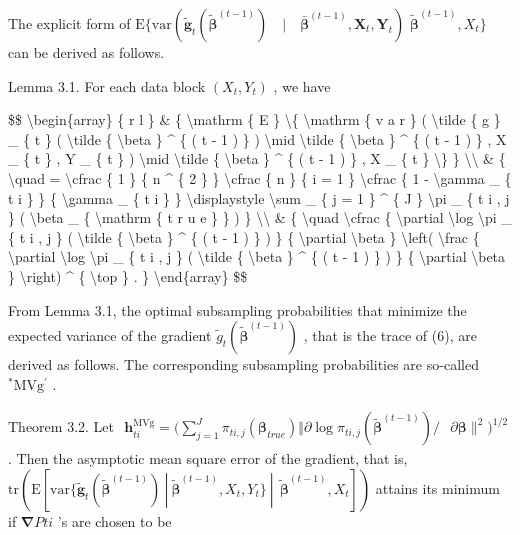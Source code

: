 \documentclass[
  10
]{article}
\begin{document}
The explicit form of
\(\mathrm { E } \{ \mathrm { v a r } ( \tilde { \pmb g } _ { t } ( \tilde { \pmb \beta } ^ { ( t - 1 ) } ) \quad | \quad \bar { \pmb \beta } ^ { ( t - 1 ) } , \boldsymbol { X } _ { t } , \boldsymbol { Y } _ { t } )\)
\(\tilde { \pmb { \beta } } ^ { ( t - 1 ) } , X _ { t } \}\) can be
derived as follows.

Lemma 3.1. For each data block \(( X _ { t } , Y _ { t } )\) , we have

{\$\$ \textbackslash begin\{array\} \{ r l \} \& \{
\textbackslash mathrm \{ E \} \textbackslash\{ \textbackslash mathrm \{
v a r \} ( \textbackslash tilde \{ g \} \_ \{ t \} (
\textbackslash tilde \{ \textbackslash beta \} \^{} \{ ( t - 1 ) \} )
\textbackslash mid \textbackslash tilde \{ \textbackslash beta \} \^{}
\{ ( t - 1 ) \} , X \_ \{ t \} , Y \_ \{ t \} ) \textbackslash mid
\textbackslash tilde \{ \textbackslash beta \} \^{} \{ ( t - 1 ) \} , X
\_ \{ t \} \textbackslash\} \} \textbackslash\textbackslash{} \& \{
\textbackslash quad = \textbackslash cfrac \{ 1 \} \{ n \^{} \{ 2 \} \}
\textbackslash cfrac \{ n \} \{ i = 1 \} \textbackslash cfrac \{ 1 -
\textbackslash gamma \_ \{ t i \} \} \{ \textbackslash gamma \_ \{ t i
\} \} \textbackslash displaystyle \textbackslash sum \_ \{ j = 1 \} \^{}
\{ J \} \textbackslash pi \_ \{ t i , j \} ( \textbackslash beta \_ \{
\textbackslash mathrm \{ t r u e \} \} ) \}
\textbackslash\textbackslash{} \& \{ \textbackslash quad
\textbackslash cfrac \{ \textbackslash partial \textbackslash log
\textbackslash pi \_ \{ t i , j \} ( \textbackslash tilde \{
\textbackslash beta \} \^{} \{ ( t - 1 ) \} ) \} \{
\textbackslash partial \textbackslash beta \} \textbackslash left(
\textbackslash frac \{ \textbackslash partial \textbackslash log
\textbackslash pi \_ \{ t i , j \} ( \textbackslash tilde \{
\textbackslash beta \} \^{} \{ ( t - 1 ) \} ) \} \{
\textbackslash partial \textbackslash beta \} \textbackslash right) \^{}
\{ \textbackslash top \} . \} \textbackslash end\{array\} \$\$}

From Lemma 3.1, the optimal subsampling probabilities that minimize the
expected variance of the gradient
\(\tilde { g } _ { t } ( \tilde { \boldsymbol { \beta } } ^ { ( t - 1 ) } )\)
, that is the trace of (6), are derived as follows. The corresponding
subsampling probabilities are so-called
\(\mathrm { ^ { \ast } M V g ^ { \prime } }\) .

Theorem 3.2. Let
\(\begin{array} { r } { \pmb { h } _ { t i } ^ { \mathrm { M V g } } = ( \sum _ { j = 1 } ^ { J } \pi _ { t i , j } ( \pmb { \beta } _ { t r u e } ) \Vert \partial \log \pi _ { t i , j } ( \tilde { \pmb { \beta } } ^ { ( t - 1 ) } ) / } \end{array}\)
\(\partial \pmb { \beta } \| ^ { 2 } ) ^ { 1 / 2 }\) . Then the
asymptotic mean square error of the gradient, that is,
\(\mathrm { t r } ( \mathrm { E } [ \mathrm { v a r } \{ \tilde { \pmb { g } } _ { t } ( \tilde { \pmb { \beta } } ^ { ( t - 1 ) } ) \ | \ \tilde { \pmb { \beta } } ^ { ( t - 1 ) } , X _ { t } , Y _ { t } \} \ | \ \tilde { \ { \pmb { \beta } } } ^ { ( t - 1 ) } , X _ { t } ] )\)
attains its minimum if \(\mathbf { \nabla } P t i\) 's are chosen to be
\end{document}
